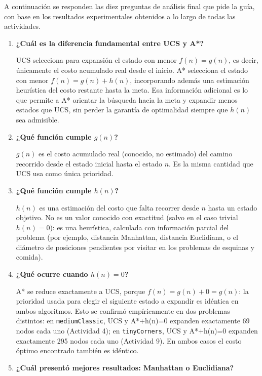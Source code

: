 A continuación se responden las diez preguntas de análisis final que pide la guía, con base en los
resultados experimentales obtenidos a lo largo de todas las actividades.

\begin{enumerate}

\item \textbf{¿Cuál es la diferencia fundamental entre UCS y A*?}

UCS selecciona para expansión el estado con menor $f(n) = g(n)$, es decir, únicamente el costo
acumulado real desde el inicio. A* selecciona el estado con menor $f(n) = g(n) + h(n)$,
incorporando además una estimación heurística del costo restante hasta la meta. Esa información
adicional es lo que permite a A* orientar la búsqueda hacia la meta y expandir menos estados que
UCS, sin perder la garantía de optimalidad siempre que $h(n)$ sea admisible.

\item \textbf{¿Qué función cumple $g(n)$?}

$g(n)$ es el costo acumulado real (conocido, no estimado) del camino recorrido desde el estado
inicial hasta el estado $n$. Es la misma cantidad que UCS usa como única prioridad.

\item \textbf{¿Qué función cumple $h(n)$?}

$h(n)$ es una estimación del costo que falta recorrer desde $n$ hasta un estado objetivo. No es un
valor conocido con exactitud (salvo en el caso trivial $h(n)=0$): es una heurística, calculada con
información parcial del problema (por ejemplo, distancia Manhattan, distancia Euclidiana, o el
diámetro de posiciones pendientes por visitar en los problemas de esquinas y comida).

\item \textbf{¿Qué ocurre cuando $h(n) = 0$?}

A* se reduce exactamente a UCS, porque $f(n) = g(n) + 0 = g(n)$: la prioridad usada para elegir el
siguiente estado a expandir es idéntica en ambos algoritmos. Esto se confirmó empíricamente en dos
problemas distintos: en \texttt{mediumClassic}, UCS y A*+h(n)=0 expanden exactamente 69 nodos cada
uno (Actividad 4); en \texttt{tinyCorners}, UCS y A*+h(n)=0 expanden exactamente 295 nodos cada uno
(Actividad 9). En ambos casos el costo óptimo encontrado también es idéntico.

\item \textbf{¿Cuál presentó mejores resultados: Manhattan o Euclidiana?}


\end{enumerate}
